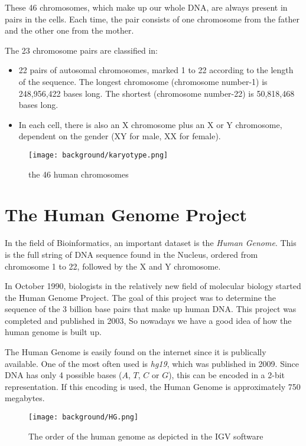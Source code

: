 These 46 chromosomes, which make up our whole DNA, are always present in pairs in the cells. Each time, the pair consists of one chromosome from the father and the other one from the mother. 

The 23 chromosome pairs are classified in:
\begin{itemize}
	\item 22 pairs of autosomal chromosomes, marked 1 to 22 according to the length of the sequence. The longest chromosome (chromosome number-1) is 248,956,422 bases long. The shortest (chromosome number-22) is 50,818,468 bases long.
	\item In each cell, there is also an X chromosome plus an X or Y chromosome, dependent on the gender (XY for male, XX for female).
\end{itemize}


\begin{figure}[H]
	\centering
	\texttt{[image: background/karyotype.png]}
	\caption{the 46 human chromosomes}
	\label{fig:karyotype}
\end{figure}


\section{The Human Genome Project}

In the field of Bioinformatics, an important dataset is the \emph{Human Genome}. This is the full string of DNA sequence found in the Nucleus, ordered from chromosome 1 to 22, followed by the X and Y chromosome.

In October 1990, biologists in the relatively new field of molecular biology started the Human Genome Project. The goal of this project was to determine the sequence of the 3 billion base pairs that make up human DNA. This project was completed and published in 2003, So nowadays we have a good idea of how the human genome is built up.

The Human Genome is easily found on the internet since it is publically available. One of the most often used is \emph{hg19}, which was published in 2009. Since DNA has only 4 possible bases ($A$, $T$, $C$ or $G$), this can be encoded in a 2-bit representation. If this encoding is used, the Human Genome is approximately 750 megabytes.

\begin{figure}[H]
	\centering
	\texttt{[image: background/HG.png]}
	\caption{The order of the human genome as depicted in the IGV software}
	\label{fig:HG}
\end{figure}

